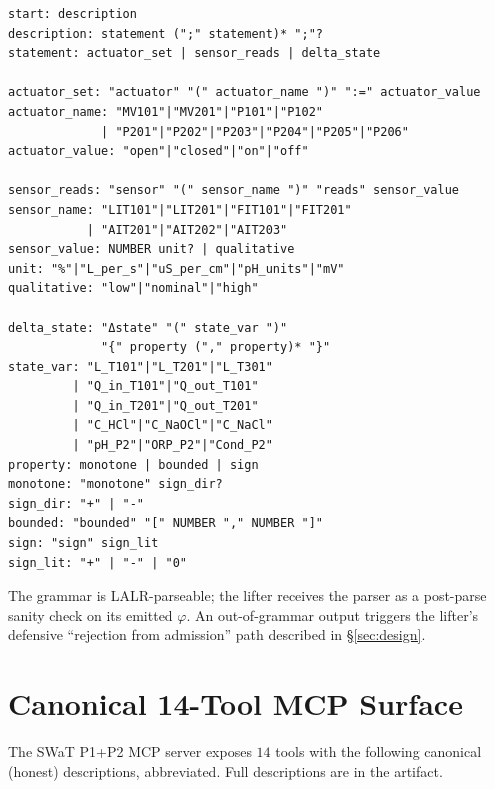 \begin{small}
\begin{verbatim}
start: description
description: statement (";" statement)* ";"?
statement: actuator_set | sensor_reads | delta_state

actuator_set: "actuator" "(" actuator_name ")" ":=" actuator_value
actuator_name: "MV101"|"MV201"|"P101"|"P102"
             | "P201"|"P202"|"P203"|"P204"|"P205"|"P206"
actuator_value: "open"|"closed"|"on"|"off"

sensor_reads: "sensor" "(" sensor_name ")" "reads" sensor_value
sensor_name: "LIT101"|"LIT201"|"FIT101"|"FIT201"
           | "AIT201"|"AIT202"|"AIT203"
sensor_value: NUMBER unit? | qualitative
unit: "%"|"L_per_s"|"uS_per_cm"|"pH_units"|"mV"
qualitative: "low"|"nominal"|"high"

delta_state: "Δstate" "(" state_var ")"
             "{" property ("," property)* "}"
state_var: "L_T101"|"L_T201"|"L_T301"
         | "Q_in_T101"|"Q_out_T101"
         | "Q_in_T201"|"Q_out_T201"
         | "C_HCl"|"C_NaOCl"|"C_NaCl"
         | "pH_P2"|"ORP_P2"|"Cond_P2"
property: monotone | bounded | sign
monotone: "monotone" sign_dir?
sign_dir: "+" | "-"
bounded: "bounded" "[" NUMBER "," NUMBER "]"
sign: "sign" sign_lit
sign_lit: "+" | "-" | "0"
\end{verbatim}
\end{small}

The grammar is LALR-parseable; the lifter receives the parser as a
post-parse sanity check on its emitted $\varphi$. An out-of-grammar
output triggers the lifter's defensive ``rejection from admission''
path described in \S\ref{sec:design}.

\section{Canonical 14-Tool MCP Surface}
\label{app:tools}

The SWaT P1+P2 MCP server exposes $14$ tools with the following
canonical (honest) descriptions, abbreviated. Full descriptions are
in the artifact.

